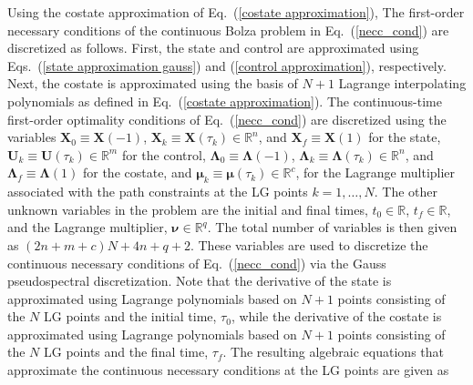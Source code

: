 \documentclass[10pt,final]{report}
\begin{document}
Using the costate approximation of Eq.~(\ref{costate approximation}), The
first-order necessary conditions of the continuous Bolza
problem in Eq.~(\ref{necc_cond}) are discretized as follows.  First,
the state and control are approximated using Eqs.~(\ref{state
approximation gauss}) and (\ref{control approximation}),
respectively.  Next, the costate is approximated using the basis of
$N+1$ Lagrange interpolating polynomials as defined in
Eq.~(\ref{costate approximation}).  The continuous-time first-order
optimality conditions of Eq.~(\ref{necc_cond}) are discretized using
the variables $\textbf{X}_0\equiv\textbf{X}(-1)$, $\textbf{X}_k \equiv
\textbf{X}(\tau_k) \in\mathbb{R}^n$, and
$\textbf{X}_f\equiv\textbf{X}(1)$ for the state, $\textbf{U}_k
\equiv \textbf{U}(\tau_k) \in\mathbb{R}^m$ for the control,
$\boldsymbol{\Lambda}_0\equiv\boldsymbol{\Lambda}(-1)$,
$\boldsymbol{\Lambda}_k \equiv
\boldsymbol{\Lambda}(\tau_k)\in\mathbb{R}^n$, and
$\boldsymbol{\Lambda}_f\equiv\boldsymbol{\Lambda}(1)$ for the costate,
and $\boldsymbol{\mu}_k\equiv\boldsymbol{\mu}(\tau_k)
\in\mathbb{R}^c$, for the Lagrange multiplier associated with
the path constraints at the LG points $k = 1,\ldots,N$.  The other
unknown variables in the problem are the initial and final times,
$t_0 \in\mathbb{R}$, $t_f \in \mathbb{R}$, and the Lagrange
multiplier, $\boldsymbol{\nu} \in \mathbb{R}^q$.  The total number of
variables is then given as $(2n+m+c)N+4n+q+2$.  These variables are
used to discretize the continuous necessary conditions of
Eq.~(\ref{necc_cond}) via the Gauss pseudospectral discretization.
Note that the derivative of the state is approximated using Lagrange
polynomials based on $N+1$ points consisting of the $N$ LG points
and the initial time, $\tau_0$, while the derivative of the costate is
approximated using Lagrange polynomials based on $N+1$ points
consisting of the $N$ LG points and the final time, $\tau_f$.  The
resulting algebraic equations that approximate the continuous
necessary conditions at the LG points are given as
\end{document}
